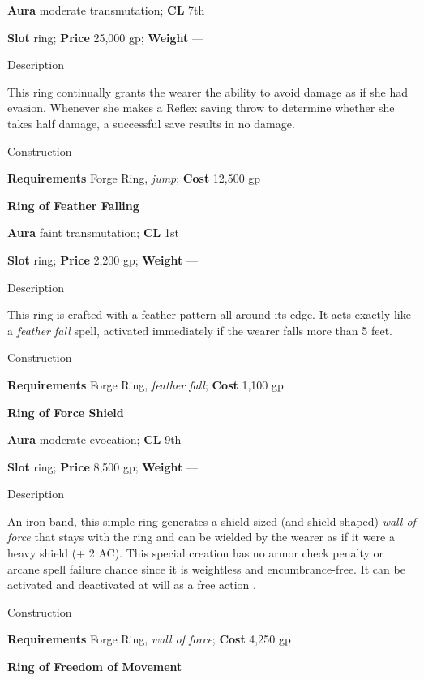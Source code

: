 \textbf{Aura} moderate transmutation;\textbf{ CL }7th
				
\textbf{Slot} ring; \textbf{Price} 25,000 gp; \textbf{Weight} ---
				
Description
				
This ring continually grants the wearer the ability to avoid damage as if she had evasion. Whenever she makes a Reflex saving throw to determine whether she takes half damage, a successful save results in no damage. 
				
Construction
				
\textbf{Requirements} Forge Ring, \textit{jump}; \textbf{Cost }12,500 gp
				
\textbf{Ring of Feather Falling}
				
\textbf{Aura} faint transmutation;\textbf{ CL }1st
				
\textbf{Slot} ring; \textbf{Price} 2,200 gp; \textbf{Weight} ---
				
Description
				
This ring 
is crafted
 with a feather pattern all around its edge. It acts exactly like a \textit{feather fall }spell, activated immediately if the wearer falls more than 5 feet. 
				
Construction
				
\textbf{Requirements} Forge Ring, \textit{feather fall}; \textbf{Cost }1,100 gp
				
\textbf{Ring of Force Shield}
				
\textbf{Aura} moderate evocation;\textbf{ CL }9th
				
\textbf{Slot} ring; \textbf{Price} 8,500 gp; \textbf{Weight} ---
				
Description
				
An iron band, this simple ring generates a shield-sized (and shield-shaped) \textit{wall of force }that stays with the ring and can be wielded by the wearer as if it were a heavy shield (+
2
 AC). This special creation has no armor check penalty or arcane spell failure chance since it is weightless and encumbrance-free. It 
can be activated and deactivated at will as a free action
. 
				
Construction
				
\textbf{Requirements} Forge Ring, \textit{wall of force}; \textbf{Cost }4,250 gp
				
\textbf{Ring of Freedom of Movement}
				
